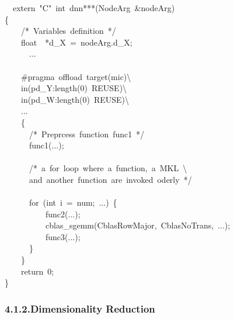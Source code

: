 \documentclass{article}
\begin{document}
\begin{mdpre}%
\noindent~~extern~{"}{C}{"}~{int}~dnn***({NodeArg}~\&nodeArg)\\
\{\\
~~~~{/*}{~Variables~definition~}{*/}\\
~~~~{float}~~*d\_X~=~nodeArg.d\_X;\\
~~~~~~...\\
~~~~\\
~~~~\#pragma~offload~target(mic)\textbackslash{}\\
~~~~in(pd\_Y:length({0})~{REUSE})\textbackslash{}\\
~~~~in(pd\_W:length({0})~{REUSE})\textbackslash{}\\
~~~~...\\
~~~~\{\\
~~~~~~{/*}{~Preprcess~function~func1~}{*/}\\
~~~~~~func1(...);\\
\\
~~~~~~{/*}{~a~for~loop~where~a~function,~a~MKL~\textbackslash{}}\\
{~~~~~~and~another~function~are~invoked~oderly~}{*/}\\
\\
~~~~~~{for}~({int}~i~=~num;~...)~\{\\
~~~~~~~~~~func2(...);\\
~~~~~~~~~~cblas\_sgemm({CblasRowMajor},~{CblasNoTrans},~...);\\
~~~~~~~~~~func3(...);\\
~~~~~~\}\\
~~~~\}~\\
~~~~{return}~{0};\\
\}\\
\end{mdpre}
\subsubsection{4.1.2.\hspace*{0.5em}Dimensionality Reduction}\label{sec-dimensionality-reduction}%
\end{document}
